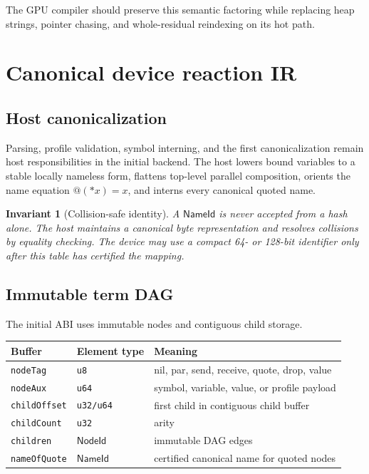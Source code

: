 \documentclass[11pt]{article}
\newtheorem{invariant}[requirement]{Invariant}
\newcommand{\code}[1]{\texttt{#1}}
\newcommand{\NameId}{\ensuremath{\mathsf{NameId}}}
\newcommand{\NodeId}{\ensuremath{\mathsf{NodeId}}}
\begin{document}
The GPU compiler should preserve this semantic factoring while replacing
heap strings, pointer chasing, and whole-residual reindexing on its hot path.

\section{Canonical device reaction IR}

\subsection{Host canonicalization}

Parsing, profile validation, symbol interning, and the first canonicalization
remain host responsibilities in the initial backend.  The host lowers bound
variables to a stable locally nameless form, flattens top-level parallel
composition, orients the name equation $@(*x)=x$, and interns every canonical
quoted name.

\begin{invariant}[Collision-safe identity]
A \NameId{} is never accepted from a hash alone.  The host maintains a
canonical byte representation and resolves collisions by equality checking.
The device may use a compact 64- or 128-bit identifier only after this table
has certified the mapping.
\end{invariant}

\subsection{Immutable term DAG}

The initial ABI uses immutable nodes and contiguous child storage.

\begin{center}
\begin{tabularx}{\textwidth}{@{}l l X@{}}
\toprule
Buffer & Element type & Meaning\\
\midrule
\code{nodeTag} & \code{u8} & nil, par, send, receive, quote, drop, value\\
\code{nodeAux} & \code{u64} & symbol, variable, value, or profile payload\\
\code{childOffset} & \code{u32/u64} & first child in contiguous child buffer\\
\code{childCount} & \code{u32} & arity\\
\code{children} & \NodeId{} & immutable DAG edges\\
\code{nameOfQuote} & \NameId{} & certified canonical name for quoted nodes\\
\bottomrule
\end{tabularx}
\end{center}
\end{document}
